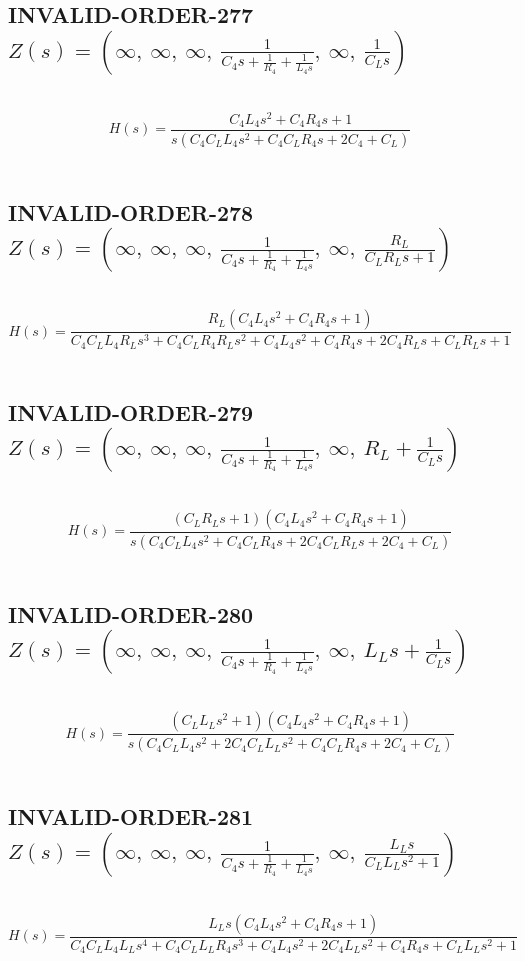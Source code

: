 \documentclass{article}
\begin{document}
\subsection{INVALID-ORDER-277 $Z(s) = \left( \infty, \  \infty, \  \infty, \  \frac{1}{C_{4} s + \frac{1}{R_{4}} + \frac{1}{L_{4} s}}, \  \infty, \  \frac{1}{C_{L} s}\right)$ } \ 
\textbf{\[H(s) = \frac{C_{4} L_{4} s^{2} + C_{4} R_{4} s + 1}{s \left(C_{4} C_{L} L_{4} s^{2} + C_{4} C_{L} R_{4} s + 2 C_{4} + C_{L}\right)}\] } \ 
\subsection{INVALID-ORDER-278 $Z(s) = \left( \infty, \  \infty, \  \infty, \  \frac{1}{C_{4} s + \frac{1}{R_{4}} + \frac{1}{L_{4} s}}, \  \infty, \  \frac{R_{L}}{C_{L} R_{L} s + 1}\right)$ } \ 
\textbf{\[H(s) = \frac{R_{L} \left(C_{4} L_{4} s^{2} + C_{4} R_{4} s + 1\right)}{C_{4} C_{L} L_{4} R_{L} s^{3} + C_{4} C_{L} R_{4} R_{L} s^{2} + C_{4} L_{4} s^{2} + C_{4} R_{4} s + 2 C_{4} R_{L} s + C_{L} R_{L} s + 1}\] } \ 
\subsection{INVALID-ORDER-279 $Z(s) = \left( \infty, \  \infty, \  \infty, \  \frac{1}{C_{4} s + \frac{1}{R_{4}} + \frac{1}{L_{4} s}}, \  \infty, \  R_{L} + \frac{1}{C_{L} s}\right)$ } \ 
\textbf{\[H(s) = \frac{\left(C_{L} R_{L} s + 1\right) \left(C_{4} L_{4} s^{2} + C_{4} R_{4} s + 1\right)}{s \left(C_{4} C_{L} L_{4} s^{2} + C_{4} C_{L} R_{4} s + 2 C_{4} C_{L} R_{L} s + 2 C_{4} + C_{L}\right)}\] } \ 
\subsection{INVALID-ORDER-280 $Z(s) = \left( \infty, \  \infty, \  \infty, \  \frac{1}{C_{4} s + \frac{1}{R_{4}} + \frac{1}{L_{4} s}}, \  \infty, \  L_{L} s + \frac{1}{C_{L} s}\right)$ } \ 
\textbf{\[H(s) = \frac{\left(C_{L} L_{L} s^{2} + 1\right) \left(C_{4} L_{4} s^{2} + C_{4} R_{4} s + 1\right)}{s \left(C_{4} C_{L} L_{4} s^{2} + 2 C_{4} C_{L} L_{L} s^{2} + C_{4} C_{L} R_{4} s + 2 C_{4} + C_{L}\right)}\] } \ 
\subsection{INVALID-ORDER-281 $Z(s) = \left( \infty, \  \infty, \  \infty, \  \frac{1}{C_{4} s + \frac{1}{R_{4}} + \frac{1}{L_{4} s}}, \  \infty, \  \frac{L_{L} s}{C_{L} L_{L} s^{2} + 1}\right)$ } \ 
\textbf{\[H(s) = \frac{L_{L} s \left(C_{4} L_{4} s^{2} + C_{4} R_{4} s + 1\right)}{C_{4} C_{L} L_{4} L_{L} s^{4} + C_{4} C_{L} L_{L} R_{4} s^{3} + C_{4} L_{4} s^{2} + 2 C_{4} L_{L} s^{2} + C_{4} R_{4} s + C_{L} L_{L} s^{2} + 1}\] } \ 
\end{document}
